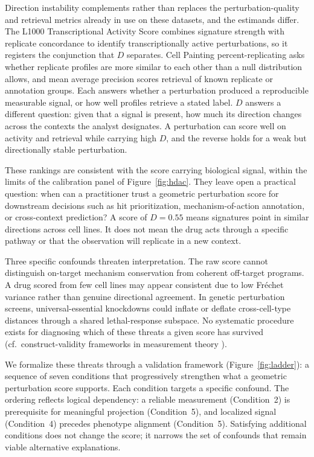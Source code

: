 \documentclass[11pt]{article}
\begin{document}
Direction instability complements rather than replaces the
perturbation-quality and retrieval metrics already in use on these
datasets, and the estimands differ. The L1000 Transcriptional Activity
Score combines signature strength with replicate concordance to identify
transcriptionally active perturbations, so it registers the conjunction
that $D$ separates. Cell Painting percent-replicating asks whether
replicate profiles are more similar to each other than a null distribution
allows, and mean average precision scores retrieval of known replicate or
annotation groups. Each answers whether a perturbation produced a
reproducible measurable signal, or how well profiles retrieve a stated
label. $D$ answers a different question: given that a signal is present,
how much its direction changes across the contexts the analyst designates.
A perturbation can score well on activity and retrieval while carrying high
$D$, and the reverse holds for a weak but directionally stable
perturbation.

These rankings are consistent with the score carrying biological signal,
within the limits of the calibration panel of Figure~\ref{fig:hdac}.
They leave open a practical question: when can a practitioner trust a
geometric perturbation score for downstream decisions such as hit
prioritization, mechanism-of-action annotation, or cross-context
prediction? A score of $D = 0.55$ means signatures point in similar
directions across cell lines. It does not mean the drug acts through a
specific pathway or that the observation will replicate in a new context.

Three specific confounds threaten interpretation. The raw score cannot
distinguish on-target mechanism conservation from coherent off-target
programs. A drug scored from few cell lines may appear consistent due to
low Fr\'echet variance rather than genuine directional agreement. In
genetic perturbation screens, universal-essential knockdowns could inflate
or deflate cross-cell-type distances through a shared lethal-response
subspace. No systematic procedure exists for diagnosing which of these
threats a given score has survived
(cf.\ construct-validity frameworks in measurement theory
\citep{cronbach1955construct,messick1995validity}).

We formalize these threats through a validation framework
(Figure~\ref{fig:ladder}): a sequence of seven conditions that
progressively strengthen what a geometric perturbation score supports.
Each condition targets a specific confound. The ordering reflects logical
dependency: a reliable measurement (Condition~2) is prerequisite for
meaningful projection (Condition~5), and localized signal (Condition~4)
precedes phenotype alignment (Condition~5). Satisfying additional
conditions does not change the score; it narrows the set of confounds
that remain viable alternative explanations.
\end{document}
